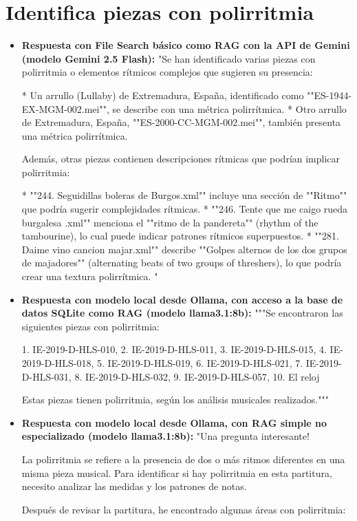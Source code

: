 \section{Identifica piezas con polirritmia}
\begin{itemize}
    \item \textbf{Respuesta con File Search básico como RAG con la API de Gemini (modelo Gemini 2.5 Flash):} "Se han identificado varias piezas con polirritmia o elementos rítmicos complejos que sugieren su presencia:

*   Un arrullo (Lullaby) de Extremadura, España, identificado como ""ES-1944-EX-MGM-002.mei"", se describe con una métrica polirrítmica.
*   Otro arrullo de Extremadura, España, ""ES-2000-CC-MGM-002.mei"", también presenta una métrica polirrítmica.

Además, otras piezas contienen descripciones rítmicas que podrían implicar polirritmia:

*   ""244. Seguidillas boleras de Burgos.xml"" incluye una sección de ""Ritmo"" que podría sugerir complejidades rítmicas.
*   ""246. Tente que me caigo rueda burgalesa .xml"" menciona el ""ritmo de la pandereta"" (rhythm of the tambourine), lo cual puede indicar patrones rítmicos superpuestos.
*   ""281. Daime vino cancion majar.xml"" describe ""Golpes alternos de los dos grupos de majadores"" (alternating beats of two groups of threshers), lo que podría crear una textura polirrítmica.
"
    \item \textbf{Respuesta con modelo local desde Ollama, con acceso a la base de datos SQLite como RAG (modelo llama3.1:8b):} """Se encontraron las siguientes piezas con polirritmia:

1. IE-2019-D-HLS-010,
2. IE-2019-D-HLS-011,
3. IE-2019-D-HLS-015,
4. IE-2019-D-HLS-018,
5. IE-2019-D-HLS-019,
6. IE-2019-D-HLS-021,
7. IE-2019-D-HLS-031,
8. IE-2019-D-HLS-032,
9. IE-2019-D-HLS-057,
10. El reloj

Estas piezas tienen polirritmia, según los análisis musicales realizados."""
\item \textbf{Respuesta con modelo local desde Ollama, con RAG simple no especializado (modelo llama3.1:8b):} "Una pregunta interesante!

La polirritmia se refiere a la presencia de dos o más ritmos diferentes en una misma pieza musical. Para identificar si hay polirritmia en esta partitura, necesito analizar las medidas y los patrones de notas.

Después de revisar la partitura, he encontrado algunas áreas con polirritmia:


\end{itemize}
